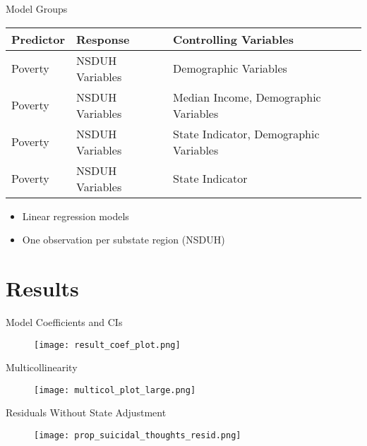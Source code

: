 \documentclass{beamer}
\begin{document}
\begin{frame}{Model Groups}

\begin{table}[t]
\small
\begin{center}
\begin{tabular}{lll}
    \toprule
    Predictor & Response & Controlling Variables\\
    \toprule
    Poverty & NSDUH Variables & Demographic Variables\\
    \midrule
    Poverty & NSDUH Variables & Median Income, Demographic Variables\\
    Poverty & NSDUH Variables & State Indicator, Demographic Variables\\
    Poverty & NSDUH Variables & State Indicator\\
    \bottomrule
\end{tabular}
\end{center}
\end{table}

\begin{itemize}
     \item Linear regression models
     \item One observation per substate region (NSDUH)
\end{itemize}
\end{frame}

\section{Results}

\begin{frame}{Model Coefficients and CIs}
\begin{figure}[!htb]
    \centering
    \texttt{[image: result\_coef\_plot.png]}
\end{figure}
\end{frame}

\begin{frame}{Multicollinearity}
\begin{figure}[!htb]
    \centering
    \texttt{[image: multicol\_plot\_large.png]}
\end{figure}
\end{frame}

\begin{frame}{Residuals Without State Adjustment}
\begin{figure}[!htb]
    \centering
    \texttt{[image: prop\_suicidal\_thoughts\_resid.png]}
\end{figure}
\end{frame}
\end{document}
